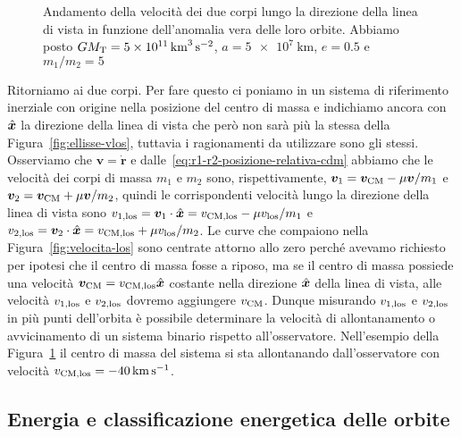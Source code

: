 {\begin{figure}
  \centering
  
  \caption[Andamento della velocità dei due corpi nella direzione della di vista
  in funzione dell'anomalia
  vera]{Andamento della velocità dei due corpi lungo la direzione della linea di
    vista in funzione dell'anomalia vera delle loro orbite. Abbiamo posto
    $GM_\textup{T} = \SI{5e11}{\cubic\kilo\metre\per\square\second}$,
    $a = \SI{5e7}{\kilo\metre}$, $e=0.5$ e $m_1/m_2=5$}
  \label{fig:velocita-los-due-corpi}
\end{figure}
Ritorniamo ai due corpi. Per fare questo ci poniamo in un sistema di riferimento
inerziale con origine nella posizione del centro di massa e indichiamo ancora
con $\hat{\bm{x}}$ la direzione della linea di vista che però non sarà più la
stessa della Figura~\ref{fig:ellisse-vlos}, tuttavia i ragionamenti da
utilizzare sono gli stessi. Osserviamo che $\bm{v}=\dot{\bm{r}}$ e
dalle~\eqref{eq:r1-r2-posizione-relativa-cdm} abbiamo che le velocità dei corpi
di massa $m_1$ e $m_2$ sono, rispettivamente,
$\bm{v}_1 = \bm{v}_\textup{CM}-\mu\bm{v}/m_1$ e
$\bm{v}_2 = \bm{v}_\textup{CM} + \mu\bm{v}/m_2$, quindi le corrispondenti
velocità lungo la direzione della linea di vista sono
$v_{1,\textup{los}} = \bm{v}_1 \cdot \hat{\bm{x}} = v_\textup{CM,los}-\mu
v_\textup{los}/m_1$
e
$v_{2,\textup{los}} = \bm{v}_2 \cdot \hat{\bm{x}} = v_\textup{CM,los} + \mu
v_\textup{los}/m_2$.
Le curve che compaiono nella Figura~\ref{fig:velocita-los} sono centrate attorno
allo zero perché avevamo richiesto per ipotesi che il centro di massa fosse a
riposo, ma se il centro di massa possiede una velocità
$\bm{v}_\textup{CM} = v_\textup{CM,los}\hat{\bm{x}}$ costante nella direzione
$\hat{\bm{x}}$ della linea di vista, alle velocità $v_{1,\textup{los}}$ e
$v_{2,\textup{los}}$ dovremo aggiungere $v_\textup{CM}$. Dunque misurando
$v_{1,\textup{los}}$ e $v_{2,\textup{los}}$ in più punti dell'orbita è possibile
determinare la velocità di allontanamento o avvicinamento di un sistema binario
rispetto all'osservatore. Nell'esempio della
Figura~\ref{fig:velocita-los-due-corpi} il centro di massa del sistema si sta
allontanando dall'osservatore con velocità
$v_\textup{CM,los} = \SI{-40}{\kilo\metre\per\second}$.

\subsection{Energia e classificazione energetica delle orbite}
\label{sec:energia-orbite}

}
